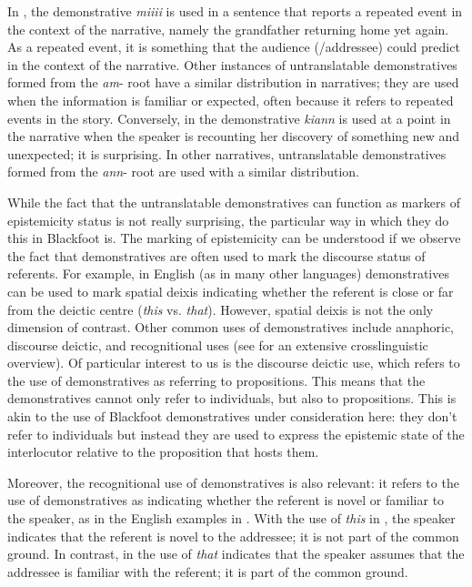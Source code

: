 \documentclass[output=paper,colorlinks,citecolor=brown]{langscibook}
\begin{document}
In , the demonstrative \textit{miiii} is used in a sentence that reports a repeated event in the context of the narrative, namely the grandfather returning home yet again. As a repeated event, it is something that the audience (/addressee) could predict in the context of the narrative. Other instances of untranslatable demonstratives formed from the \textit{am}- root have a similar distribution in narratives; they are used when the information is familiar or expected, often because it refers to repeated events in the story. Conversely, in  the demonstrative \textit{kiann} is used at a point in the narrative when the speaker is recounting her discovery of something new and unexpected; it is surprising. In other narratives, untranslatable demonstratives formed from the \textit{ann}- root are used with a similar distribution. 

While the fact that the untranslatable demonstratives can function as markers of epistemicity status is not really surprising, the particular way in which they do this in Blackfoot is. The marking of epistemicity can be understood if we observe the fact that demonstratives are often used to mark the discourse status of referents. For example, in English (as in many other languages) demonstratives can be used to mark spatial deixis indicating whether the referent is close or far from the deictic centre (\textit{this} vs. \textit{that}). However, spatial deixis is not the only dimension of contrast. Other common uses of demonstratives include anaphoric, discourse deictic, and recognitional uses (see \citet{Diessel1999Book} for an extensive crosslinguistic overview). Of particular interest to us is the discourse deictic use, which refers to the use of demonstratives as referring to propositions. This means that the demonstratives cannot only refer to individuals, but also to propositions. This is akin to the use of Blackfoot demonstratives under consideration here: they don’t refer to individuals but instead they are used to express the epistemic state of the interlocutor relative to the proposition that hosts them. 

Moreover, the recognitional use of demonstratives is also relevant: it refers to the use of demonstratives as indicating whether the referent is novel or familiar to the speaker, as in the English examples in . With the use of \textit{this} in , the speaker indicates that the referent is novel to the addressee; it is not part of the common ground. In contrast, in  the use of \textit{that} indicates that the speaker assumes that the addressee is familiar with the referent; it is part of the common ground. 
\end{document}
